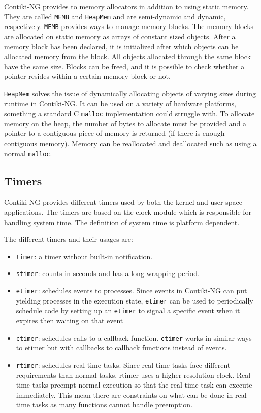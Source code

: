 \documentclass[0-thesis.tex]{subfiles}
\begin{document}
Contiki-NG provides to memory allocators in addition to using static memory. They are
called \texttt{MEMB} and \texttt{HeapMem} and are semi-dynamic and dynamic, respectively.
\texttt{MEMB} provides ways to manage memory blocks. The memory blocks are allocated on
static memory as arrays of constant sized objects. After a memory block has been declared,
it is initialized after which objects can be allocated memory from the block. All objects
allocated through the same block have the same size. Blocks can be freed, and it is
possible to check whether a pointer resides within a certain memory block or not.

\texttt{HeapMem} solves the issue of dynamically allocating objects of varying sizes
during runtime in Contiki-NG. It can be used on a variety of hardware platforms, something
a standard C \texttt{malloc} implementation could struggle with. To allocate memory on the
heap, the number of bytes to allocate must be provided and a pointer to a contiguous piece
of memory is returned (if there is enough contiguous memory). Memory can be reallocated
and deallocated such as using a normal \texttt{malloc}.

\subsection{Timers}
\label{ssec:timers}
Contiki-NG provides different timers used by both the kernel and user-space applications.
The timers are based on the clock module which is responsible for handling system time.
The definition of system time is platform dependent.

The different timers and their usages are:
\begin{itemize}
    \item \texttt{timer}: a timer without built-in notification.
    \item \texttt{stimer}: counts in seconds and has a long wrapping period.
    \item \texttt{etimer}: schedules events to processes. Since events in Contiki-NG
            can put yielding processes in the execution state, \texttt{etimer} can be
            used to periodically schedule code by setting up an \texttt{etimer} to
            signal a specific event when it expires then waiting on that event
    \item \texttt{ctimer}: schedules calls to a callback function. \texttt{ctimer}
            works in similar ways to etimer but with callbacks to callback functions
            instead of events.
    \item \texttt{rtimer}: schedules real-time tasks. Since real-time tasks face
            different requirements than normal tasks, rtimer uses a higher resolution
            clock. Real-time tasks preempt normal execution so that the real-time task can
            execute immediately. This mean there are constraints on what can be done in
            real-time tasks as many functions cannot handle preemption.
\end{itemize}
\end{document}

